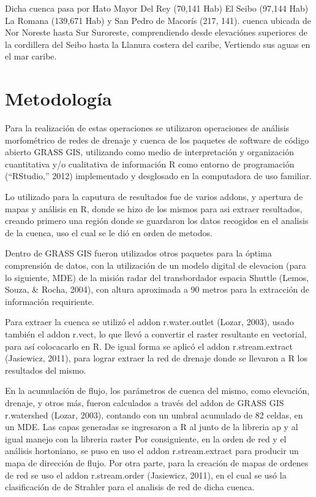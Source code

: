 \documentclass[11pt,]{article}
\begin{document}
Dicha cuenca pasa por Hato Mayor Del Rey (70,141 Hab) El Seibo (97,144
Hab) La Romana (139,671 Hab) y San Pedro de Macorís (217, 141). cuenca
ubicada de Nor Noreste hasta Sur Suroreste, comprendiendo desde
elevaciónes superiores de la cordillera del Seibo hasta la Llanura
costera del caribe, Vertiendo sus aguas en el mar caribe.

\section{Metodología}\label{metodologuxeda}

Para la realización de estas operaciones se utilizaron operaciones de
análisis morfométrico de redes de drenaje y cuenca de los paquetes de
software de código abierto GRASS GIS, utilizando como medio de
interpretación y organización cuantitativa y/o cualitativa de
información R como entorno de programación (``RStudio,'' 2012)
implementado y desglosado en la computadora de uso familiar.

Lo utilizado para la caputura de resultados fue de varios addons, y
apertura de mapas y análisis en R, donde se hizo de los mismos para asi
extraer resultados, creando primero una región donde se guardaron los
datos recogidos en el analisis de la cuenca, uso el cual se le dió en
orden de metodos.

Dentro de GRASS GIS fueron utilizados otros paquetes para la óptima
comprensión de datos, con la utilización de un modelo digital de
elevacion (para lo siguiente, MDE) de la misión radar del transbordador
espacia Shuttle (Lemos, Souza, \& Rocha, 2004), con altura aproximada a
90 metros para la extracción de información requiriente.

Para extraer la cuenca se utilizó el addon r.water.outlet (Lozar, 2003),
usado también el addon r.vect, lo que llevó a convertir el raster
resultante en vectorial, para así colocacarlo en R. De igual forma se
aplicó el addon r.stream.extract (Jasiewicz, 2011), para lograr extraer
la red de drenaje donde se llevaron a R los resultados del mismo.

En la acumulación de flujo, los parámetros de cuenca del mismo, como
elevación, drenaje, y otros más, fueron calculados a través del addon de
GRASS GIS r.watershed (Lozar, 2003), contando con un umbral acumulado de
82 celdas, en un MDE. Las capas generadas se ingresaron a R al junto de
la libreria ap y al igual manejo con la libreria raster Por
consiguiente, en la orden de red y el análisis hortoniano, se puso en
uso el addon r.stream.extract para producir un mapa de dirección de
flujo. Por otra parte, para la creación de mapas de ordenes de red se
uso el addon r.stream.order (Jasiewicz, 2011), en el cual se usó la
clasificación de de Strahler para el analisis de red de dicha cuenca.
\end{document}
